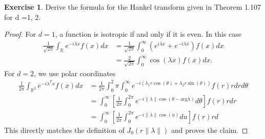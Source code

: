 \documentclass{amsart}
\theoremstyle{plain}
\theoremstyle{definition}
\newtheorem{exer}{Exercise}[section]
\newcommand{\R}{\mathbb{R}}
\begin{document}
\begin{exer}
    Derive the formula for the Hankel transform given in Theorem 1.107 for d =1, 2.
\end{exer}
\begin{proof}
For $d=1$, a function is isotropic if and only if it is even. In this case
\begin{align*}
    \frac{1}{\sqrt{2\pi}}\int_{\R}e^{-i\lambda x}f(x) dx & = \frac{1}{\sqrt{2\pi}} \int_{0}^{\infty}\left(e^{i\lambda x}+e^{-i\lambda x}\right) f(x) dx \\
    & = \frac{2}{\sqrt{2\pi}} \int_0^\infty \cos(\lambda x) f(x)dx.
\end{align*}
For $d=2$, we use polar coordinates
\begin{align*}
    \frac{1}{2\pi}\int_{\R^2}e^{-i\lambda^T x}f(x) dx &=\frac{1}{2\pi}\int_{0}^2\pi \int_0^\infty e^{-i\left(\lambda_1 r\cos(\theta) + \lambda_2 r\sin(\theta) \right)}f(r)r dr d\theta \\
    & = \int_0^\infty \left[\frac{1}{2\pi} \int_0^{2\pi} e^{-i \|\lambda\| \cos\left(\theta-\text{arg}\lambda\right)} d\theta \right] f(r)r dr\\
    &=  \int_0^\infty \left[\frac{1}{2\pi} \int_0^{2\pi} e^{-i \|\lambda\| \cos\left(u\right)} du\right] f(r)r d
\end{align*}
This directly matches the definition of $J_0\left(r\|\lambda\|\right)$ and proves the claim.
\end{proof}
\end{document}
